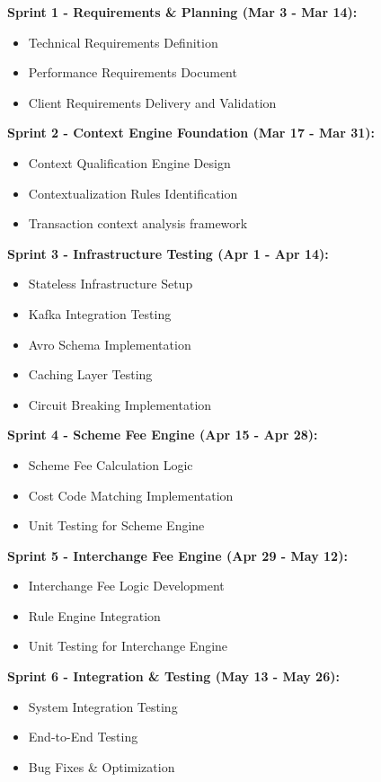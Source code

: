 \textbf{Sprint 1 - Requirements \& Planning (Mar 3 - Mar 14):}
\begin{itemize}
    \item Technical Requirements Definition
    \item Performance Requirements Document
    \item Client Requirements Delivery and Validation
\end{itemize}

\textbf{Sprint 2 - Context Engine Foundation (Mar 17 - Mar 31):}
\begin{itemize}
    \item Context Qualification Engine Design
    \item Contextualization Rules Identification
    \item Transaction context analysis framework
\end{itemize}

\textbf{Sprint 3 - Infrastructure Testing (Apr 1 - Apr 14):}
\begin{itemize}
    \item Stateless Infrastructure Setup
    \item Kafka Integration Testing
    \item Avro Schema Implementation
    \item Caching Layer Testing
    \item Circuit Breaking Implementation
\end{itemize}

\textbf{Sprint 4 - Scheme Fee Engine (Apr 15 - Apr 28):}
\begin{itemize}
    \item Scheme Fee Calculation Logic
    \item Cost Code Matching Implementation
    \item Unit Testing for Scheme Engine
\end{itemize}

\textbf{Sprint 5 - Interchange Fee Engine (Apr 29 - May 12):}
\begin{itemize}
    \item Interchange Fee Logic Development
    \item Rule Engine Integration
    \item Unit Testing for Interchange Engine
\end{itemize}

\textbf{Sprint 6 - Integration \& Testing (May 13 - May 26):}
\begin{itemize}
    \item System Integration Testing
    \item End-to-End Testing
    \item Bug Fixes \& Optimization
\end{itemize}

